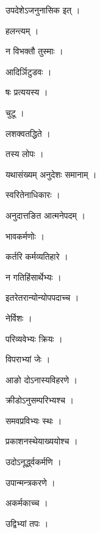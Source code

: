 \documentclass[10pt, openany]{book}
\begin{document}
\noindent उपदेशेऽजनुनासिक इत् ।

\noindent हलन्त्यम् ।

\noindent न विभक्तौ तुस्माः ।

\noindent आदिर्ञिटुडवः ।

\noindent षः प्रत्ययस्य ।

\noindent चुटू ।

\noindent लशक्वतद्धिते ।

\noindent तस्य लोपः ।

\noindent यथासंख्यम् अनुदेशः समानाम् ।

\noindent स्वरितेनाधिकारः ।

\noindent अनुदात्तङित आत्मनेपदम् ।

\noindent भावकर्मणोः ।

\noindent कर्तरि कर्मव्यतिहारे ।

\noindent न गतिहिंसार्थेभ्यः ।

\noindent इतरेतरान्योन्योपपदाच्च ।

\noindent नेर्विशः ।

\noindent परिव्यवेभ्यः क्रियः ।

\noindent विपराभ्यां जेः ।

\noindent आङो दोऽनास्यविहरणे ।

\noindent क्रीडोऽनुसम्परिभ्यश्च ।

\noindent समवप्रविभ्यः स्थः ।

\noindent प्रकाशनस्थेयाख्ययोश्च ।

\noindent उदोऽनूर्द्ध्वकर्मणि ।

\noindent उपान्मन्त्रकरणे ।

\noindent अकर्मकाच्च ।

\noindent उद्विभ्यां तपः ।
\end{document}
